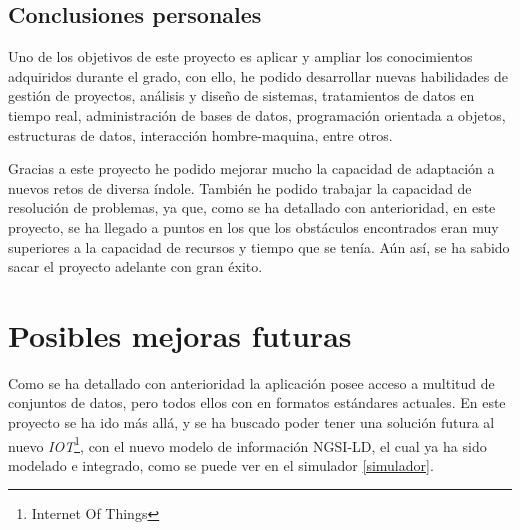 \subsection{Conclusiones personales}
Uno de los objetivos de este proyecto es aplicar y ampliar los conocimientos adquiridos durante el grado, con ello, he podido desarrollar nuevas habilidades de gestión de proyectos, análisis y diseño de sistemas, tratamientos de datos en tiempo real, administración de bases de datos, programación orientada a objetos, estructuras de datos, interacción hombre-maquina, entre otros.

Gracias a este proyecto he podido mejorar mucho la capacidad de adaptación a nuevos retos de diversa índole. También he podido trabajar la capacidad de resolución de problemas, ya que, como se ha detallado con anterioridad, en este proyecto, se ha llegado a puntos en los que los obstáculos encontrados eran muy superiores a la capacidad de recursos y tiempo que se tenía. Aún así, se ha sabido sacar el proyecto adelante con gran éxito.


\section{Posibles mejoras futuras}

Como se ha detallado con anterioridad la aplicación posee acceso a multitud de conjuntos de datos, pero todos ellos con en formatos estándares actuales. En este proyecto se ha ido más allá, y se ha buscado poder tener una solución futura al nuevo \textit{IOT}\footnote{Internet Of Things}, con el nuevo modelo de información NGSI-LD, el cual ya ha sido modelado e integrado, como se puede ver en el simulador \ref{simulador}.